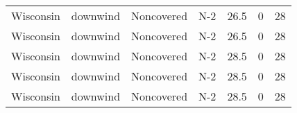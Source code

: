 \documentclass{article}
\begin{document}
\begin{longtable}[c]{ccccccc}
Wisconsin & downwind  & Noncovered & N-2             & 26.5         & 0           & 28  \\
Wisconsin & downwind  & Noncovered & N-2             & 26.5         & 0           & 28  \\
Wisconsin & downwind  & Noncovered & N-2             & 28.5         & 0           & 28  \\
Wisconsin & downwind  & Noncovered & N-2             & 28.5         & 0           & 28  \\
Wisconsin & downwind  & Noncovered & N-2             & 28.5         & 0           & 28  \\ \hline
\end{longtable}



\pagebreak
\end{document}
